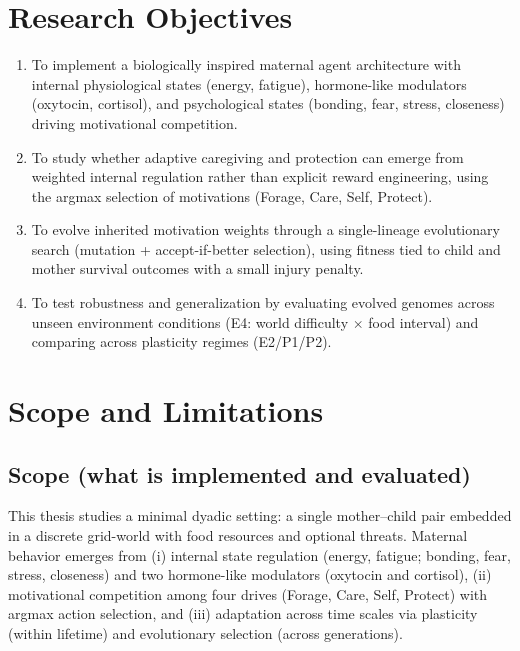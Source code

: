 \section{Research Objectives}

\begin{enumerate}

\item To implement a biologically inspired maternal agent architecture with internal physiological states (energy, fatigue), hormone-like modulators (oxytocin, cortisol), and psychological states (bonding, fear, stress, closeness) driving motivational competition.

\item To study whether adaptive caregiving and protection can emerge from weighted internal regulation rather than explicit reward engineering, using the argmax selection of motivations (Forage, Care, Self, Protect).

\item To evolve inherited motivation weights through a single-lineage evolutionary search (mutation + accept-if-better selection), using fitness tied to child and mother survival outcomes with a small injury penalty.

\item To test robustness and generalization by evaluating evolved genomes across unseen environment conditions (E4: world difficulty $\times$ food interval) and comparing across plasticity regimes (E2/P1/P2).

\end{enumerate}




\section{Scope and Limitations}

\subsection{Scope (what is implemented and evaluated)}
This thesis studies a minimal dyadic setting: a single mother--child pair embedded in a discrete grid-world with food resources and optional threats. Maternal behavior emerges from (i) internal state regulation (energy, fatigue; bonding, fear, stress, closeness) and two hormone-like modulators (oxytocin and cortisol), (ii) motivational competition among four drives (Forage, Care, Self, Protect) with argmax action selection, and (iii) adaptation across time scales via plasticity (within lifetime) and evolutionary selection (across generations).

